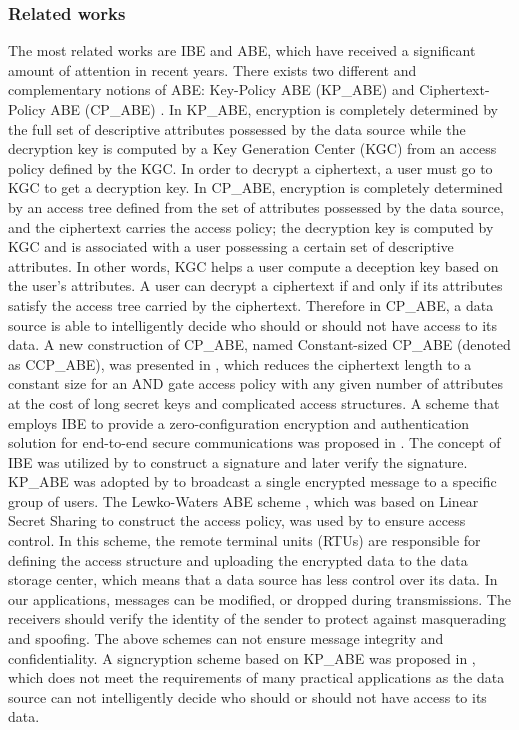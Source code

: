 \documentclass[letterpaper,12pt]{article}
\begin{document}
\subsubsection {Related works}
The most related works are IBE and ABE, which have received a significant amount of attention in recent years. There exists two different and complementary notions of ABE: Key-Policy ABE (KP\_ABE) \cite{goyal2006attribute} and Ciphertext-Policy ABE (CP\_ABE) \cite{bethencourt2007ciphertext}. In KP\_ABE, encryption is completely determined by the full set of descriptive attributes possessed by the data source while the decryption key is computed by a Key Generation Center (KGC) from an access policy defined by the KGC. In order to decrypt a ciphertext, a user must go to KGC to get a decryption key. In CP\_ABE, encryption is completely determined by an access tree defined from the set of attributes possessed by the data source, and the ciphertext carries the access policy; the decryption key is computed by KGC and is associated with a user possessing a certain set of descriptive attributes. In other words, KGC helps a user compute a deception key based on the user's attributes. A user can decrypt a ciphertext if and only if its attributes satisfy the access tree carried by the ciphertext.  Therefore in CP\_ABE, a data source is able to intelligently decide who should or should not have access to its data.  A new construction of CP\_ABE, named Constant-sized CP\_ABE (denoted as CCP\_ABE), was presented in \cite{zhou2010efficient}, which reduces the ciphertext length to a constant size for an AND gate access policy with any given number of attributes at the cost of long secret keys and complicated access structures.
%
A scheme that employs IBE to provide a zero-configuration encryption and authentication solution for end-to-end secure communications was proposed in \cite{so2010zero}. The concept of IBE was utilized by \cite{lu2012eppa} to construct a signature and later verify the signature. KP\_ABE was adopted by \cite{fadlullahtowards} to broadcast a single encrypted message to a specific group of users. The Lewko-Waters ABE scheme \cite{lewko2011decentralizing}, which was based on Linear Secret Sharing to construct the access policy, was used by \cite{ruj2011security}  to ensure access control. In this scheme, the remote terminal units (RTUs) are responsible for defining the access structure and uploading the encrypted data to the data storage center, which means that a data source has less control over its data. In our applications, messages can be modified, or dropped during transmissions. The receivers should verify the identity of the sender to protect against masquerading and spoofing. The above schemes can not ensure message integrity and confidentiality. A signcryption scheme based on KP\_ABE was proposed in \cite{gagne2010threshold}, which does not meet the requirements of many practical applications as the data source can not intelligently decide who should or should not have access to its data.
\end{document}
